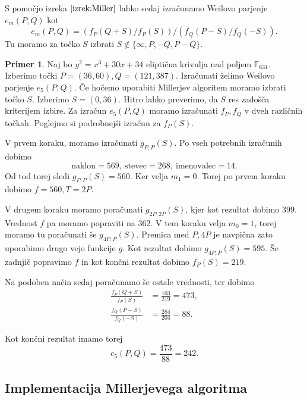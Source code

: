 \documentclass[12pt,a4paper,twoside]{article}
\theoremstyle{definition} %
\newtheorem{primer}[definicija]{Primer}
\theoremstyle{plain} %
\numberwithin{equation}{section}  %
\newcommand{\F}{\mathbb F}
\begin{document}
S pomočjo izreka $\ref{izrek:Miller}$ lahko sedaj izračunamo Weilovo parjenje $e_m(P,Q)$ kot
$$e_m(P,Q) = (f_P(Q+S)/f_P(S)) / (f_Q(P-S)/f_Q(-S)) .$$
Tu moramo za točko $S$ izbrati $S \notin \{ \infty,P,-Q,P-Q\}$.

\begin{primer}

Naj bo $y^2 = x^3+30x+34$ eliptična krivulja nad poljem $\F_{631}$. Izberimo točki $P = (36,60),Q = (121,387)$. Izračunati želimo Weilovo parjenje $e_5(P,Q)$. Če hočemo uporabiti Millerjev algoritem moramo izbrati točko $S$. Izberimo $S=(0,36)$. Hitro lahko preverimo, da $S$ res zadošča kriterijem izbire.
Za izračun $e_5(P,Q)$ moramo izračunati $f_P,f_Q$ v dveh različnih točkah. Poglejmo si podrobnejši izračun za $f_P(S)$.

V prvem koraku, moramo izračunati $g_{P,P}(S)$. Po vseh potrebnih izračunih dobimo $$\text{naklon} = 569,\ \text{stevec} = 268,\ \text{imenovalec} = 14.$$ Od tod torej sledi $g_{P,P}(S) = 560$. Ker velja $m_1 = 0$. Torej po prvem koraku dobimo $f = 560, T = 2P$.

V drugem koraku moramo poračunati $g_{2P,2P}(S)$, kjer kot rezultat dobimo $399$. Vrednost $f$ pa moramo popraviti na $362$. V tem koraku velja $m_0 = 1$, torej moramo tu poračunati še
$g_{4P,P}(S)$. Premica med $P,4P$ je navpična zato uporabimo drugo vejo funkcije $g$. Kot rezultat dobimo $g_{4P,P}(S) = 595$. Še zadnjič popravimo $f$ in kot končni rezultat dobimo
$f_P(S) = 219$.

Na podoben način sedaj poračunamo še ostale vrednosti, ter dobimo
\begin{align}
\frac{f_P(Q+S)}{f_P(S)} &{}= \frac{103}{219} = 473, \nonumber \\
\frac{f_Q(P-S)}{f_Q(-S)} &{}= \frac{284}{204} = 88. \nonumber
\end{align}

Kot končni rezultat imamo torej
$$e_5(P,Q) =\frac{473}{88} = 242.$$

\end{primer}

\subsection{Implementacija Millerjevega algoritma}



\end{document}
